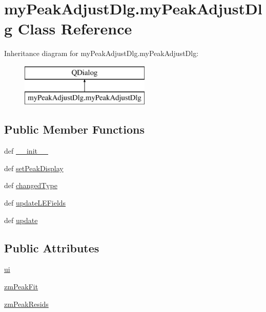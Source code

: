 \hypertarget{classmy_peak_adjust_dlg_1_1my_peak_adjust_dlg}{\section{my\-Peak\-Adjust\-Dlg.\-my\-Peak\-Adjust\-Dlg Class Reference}
\label{classmy_peak_adjust_dlg_1_1my_peak_adjust_dlg}
}
Inheritance diagram for my\-Peak\-Adjust\-Dlg.\-my\-Peak\-Adjust\-Dlg\-:\begin{figure}[H]
\begin{center}
\leavevmode
\includegraphics[height=2.000000cm]{classmy_peak_adjust_dlg_1_1my_peak_adjust_dlg}
\end{center}
\end{figure}
\subsection*{Public Member Functions}
\begin{DoxyCompactItemize}
\item 
def \hyperlink{classmy_peak_adjust_dlg_1_1my_peak_adjust_dlg_abaacb5b4b52585a3c95c3709c7ddc87a}{\-\_\-\-\_\-init\-\_\-\-\_\-}
\item 
def \hyperlink{classmy_peak_adjust_dlg_1_1my_peak_adjust_dlg_a8a3b1f75dfe5592add8cf68686659a41}{set\-Peak\-Display}
\item 
def \hyperlink{classmy_peak_adjust_dlg_1_1my_peak_adjust_dlg_a5ff4c61e897515906ea1cf647a8ebb4e}{changed\-Type}
\item 
def \hyperlink{classmy_peak_adjust_dlg_1_1my_peak_adjust_dlg_ad3012bad6f6dbe3c06af6758dab86acb}{update\-L\-E\-Fields}
\item 
def \hyperlink{classmy_peak_adjust_dlg_1_1my_peak_adjust_dlg_afde46489a42cbb16452829ef81097005}{update}
\end{DoxyCompactItemize}
\subsection*{Public Attributes}
\begin{DoxyCompactItemize}
\item 
\hyperlink{classmy_peak_adjust_dlg_1_1my_peak_adjust_dlg_a1fc76ecbe349bc391603074a7b2ca8c9}{ui}
\item 
\hyperlink{classmy_peak_adjust_dlg_1_1my_peak_adjust_dlg_af1e548deba0b44e985b04f37f53f4976}{zm\-Peak\-Fit}
\item 
\hyperlink{classmy_peak_adjust_dlg_1_1my_peak_adjust_dlg_a4c928c7791bd418243581ae926f275b6}{zm\-Peak\-Resids}
\end{DoxyCompactItemize}
